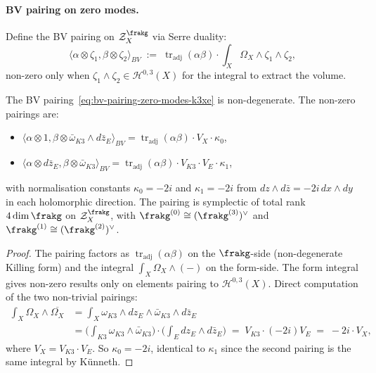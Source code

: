 \paragraph{BV pairing on zero modes.}
Define the BV pairing on $\mathcal{Z}_X^\frakg$ via Serre duality:
\begin{equation}
\label{eq:bv-pairing-zero-modes-k3xe}
 \langle \alpha \otimes \zeta_1, \beta \otimes \zeta_2 \rangle_{BV}
 \;:=\; \operatorname{tr}_{\mathrm{adj}}(\alpha \beta) \cdot \int_X \Omega_X \wedge \zeta_1 \wedge \zeta_2,
\end{equation}
non-zero only when $\zeta_1 \wedge \zeta_2 \in \mathcal{H}^{0, 3}(X)$ for
the integral to extract the volume.

\begin{lemma}
\label{lem:bv-pairing-zero-modes-nondegenerate}
\ClaimStatusProvedHere
The BV pairing~\eqref{eq:bv-pairing-zero-modes-k3xe} is non-degenerate.
The non-zero pairings are:
\begin{itemize}
\item $\langle \alpha \otimes 1, \beta \otimes \bar\omega_{K3} \wedge d\bar z_E \rangle_{BV}
 = \operatorname{tr}_{\mathrm{adj}}(\alpha \beta) \cdot V_X \cdot \kappa_0$,
\item $\langle \alpha \otimes d\bar z_E, \beta \otimes \bar\omega_{K3} \rangle_{BV}
 = \operatorname{tr}_{\mathrm{adj}}(\alpha \beta) \cdot V_{K3} \cdot V_E \cdot \kappa_1$,
\end{itemize}
with normalisation constants $\kappa_0 = -2 i$ and $\kappa_1 = -2 i$
from $dz \wedge d\bar z = -2 i\, dx \wedge dy$ in each holomorphic
direction. The pairing is symplectic of total rank $4 \dim \frakg$ on
$\mathcal{Z}_X^\frakg$, with $\frakg^{(0)} \cong (\frakg^{(3)})^\vee$ and
$\frakg^{(1)} \cong (\frakg^{(2)})^\vee$.
\end{lemma}

\begin{proof}
The pairing factors as
$\operatorname{tr}_{\mathrm{adj}}(\alpha \beta)$ on the $\frakg$-side
(non-degenerate Killing form) and the integral $\int_X \Omega_X \wedge (-)$
on the form-side. The form integral gives non-zero results only on
elements pairing to $\mathcal{H}^{0, 3}(X)$. Direct computation of the
two non-trivial pairings:
\begin{align*}
 \int_X \Omega_X \wedge \overline{\Omega_X}
 &= \int_X \omega_{K3} \wedge dz_E \wedge \bar\omega_{K3} \wedge d\bar z_E \\
 &= \biggl(\int_{K3} \omega_{K3} \wedge \bar\omega_{K3}\biggr) \cdot \biggl(\int_E dz_E \wedge d\bar z_E\biggr)
 \;=\; V_{K3} \cdot (-2i) V_E \;=\; -2 i \cdot V_X,
\end{align*}
where $V_X = V_{K3} \cdot V_E$. So $\kappa_0 = -2 i$, identical to $\kappa_1$
since the second pairing is the same integral by Künneth.
\end{proof}

